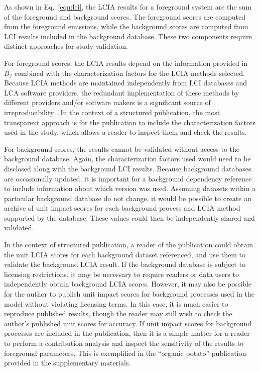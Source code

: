 As shown in Eq.~\ref{eqn:lci}, the LCIA results for a foreground system are the sum of the foreground and background scores.  The foreground scores are computed from the foreground emissions, while the background scores are computed from LCI results included in the background database.  These two components require distinct approaches for study validation.

For foreground scores, the LCIA results depend on the information provided in $B_f$ combined with the characterization factors for the LCIA methods selected.  Because LCIA methods are maintained independently from LCI databases and LCA software providers, the redundant implementation of these methods by different providers and/or software makers is a significant source of irreproducibility \citep{Speck_2015,Herrmann_2015}.  In the context of a structured publication, the most transparent approach is for the publication to include the characterization factors used in the study, which allows a reader to inspect them and check the results.  

For background scores, the results cannot be validated without access to the background database.  Again, the characterization factors used would need to be disclosed along with the background LCI results.  Because background databases are occasionally updated, it is important for a background dependency reference to include information about which version was used.  Assuming datasets within a particular background database do not change, it would be possible to create an archive of unit impact scores for each background process and LCIA method supported by the database.  These values could then be independently shared and validated.

In the context of structured publication, a reader of the publication could obtain the unit LCIA scores for each background dataset referenced, and use them to validate the background LCIA result. If the background database is subject to licensing restrictions, it may be necessary to require readers or data users to independently obtain background LCIA scores.  However, it may also be possible for the author to publish unit impact scores for background processes used in the model without violating licensing terms. In this case, it is much easier to reproduce published results, though the reader may still wish to check the author's published unit scores for accuracy.  If unit impact scores for background processes are included in the publication, then it is a simple matter for a reader to perform a contribution analysis and inspect the sensitivity of the results to foreground parameters.  This is exemplified in the ``organic potato'' publication provided in the supplementary materials.  

